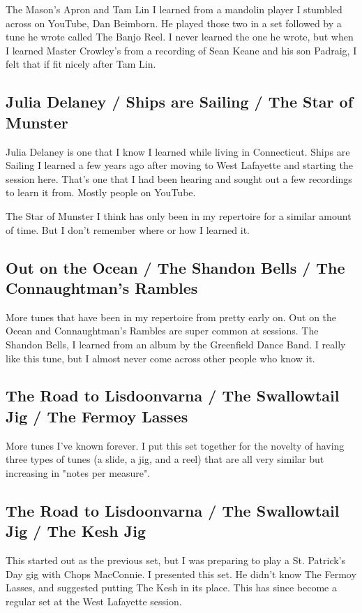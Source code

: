 \documentclass[11pt,letterpaper]{article}
\begin{document}
The Mason's Apron and Tam Lin I learned from a mandolin player I stumbled across on YouTube, Dan Beimborn. He played those two in a set followed by a tune he wrote called The Banjo Reel. I never learned the one he wrote, but when I learned Master Crowley's from a recording of Sean Keane and his son Padraig, I felt that if fit nicely after Tam Lin.

\subsection*{Julia Delaney / Ships are Sailing / The Star of Munster}
Julia Delaney is one that I know I learned while living in Connecticut. Ships are Sailing I learned a few years ago after moving to West Lafayette and starting the session here. That's one that I had been hearing and sought out a few recordings to learn it from. Mostly people on YouTube.

The Star of Munster I think has only been in my repertoire for a similar amount of time. But I don't remember where or how I learned it. 

\subsection*{Out on the Ocean / The Shandon Bells / The Connaughtman's Rambles}

More tunes that have been in my repertoire from pretty early on. Out on the Ocean and Connaughtman's Rambles are super common at sessions. The Shandon Bells, I learned from an album by the Greenfield Dance Band. I really like this tune, but I almost never come across other people who know it. 

\subsection*{The Road to Lisdoonvarna / The Swallowtail Jig / The Fermoy Lasses}

More tunes I've known forever. I put this set together for the novelty of having three types of tunes (a slide, a jig, and a reel) that are all very similar but increasing in "notes per measure".

\subsection*{The Road to Lisdoonvarna / The Swallowtail Jig / The Kesh Jig}

This started out as the previous set, but I was preparing to play a St. Patrick's Day gig with Chops MacConnie. I presented this set. He didn't know The Fermoy Lasses, and suggested putting The Kesh in its place. This has since become a regular set at the West Lafayette session.
\end{document}
